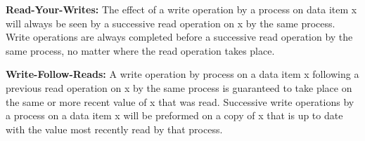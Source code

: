 \documentclass[9pt]{extarticle} %
\begin{document}
\begin{minipage}[t]{.64\linewidth}
\textbf{Read-Your-Writes:} The effect of a write operation by a process on data item x will always be seen by a successive read operation on x by the same process. Write operations are always completed before a successive read operation by the same process, no matter where the read operation takes place. 

\textbf{Write-Follow-Reads:} A write operation by process on a data item x following a previous read operation on x by the same process is guaranteed to take place on the same or more recent value of x that was read. Successive write operations by a process on a data item x will be preformed on a copy of x that is up to date with the value most recently read by that process.


\end{minipage} %
\end{document}
